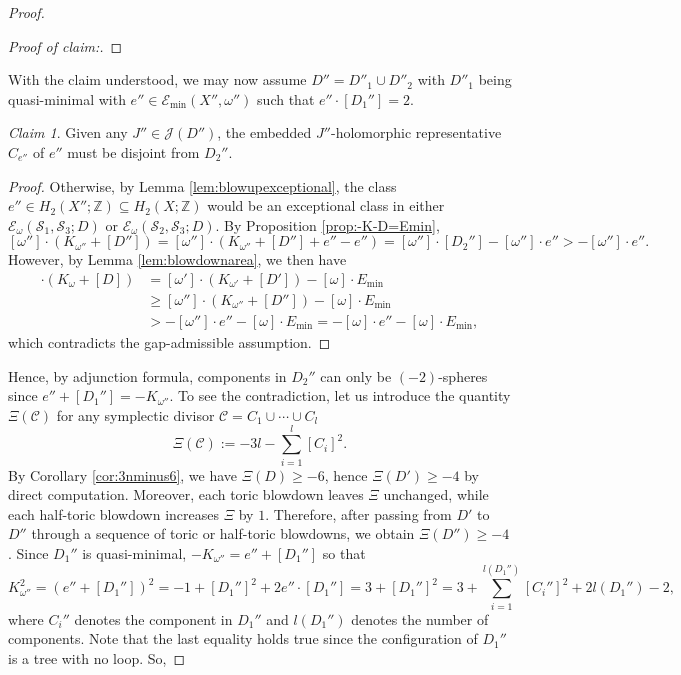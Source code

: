\documentclass[11pt]{article}
\theoremstyle{definition}
\theoremstyle{remark}
\newtheorem{claim}[theorem]{Claim}
\newcommand{\st}{\mathcal{S}}
\begin{document}
\begin{proof}
\begin{proof}[Proof of claim:]
\end{proof}
 With the claim understood, we may now assume $D''=D''_1\cup D''_2$ with $D''_1$ being quasi-minimal with $e''\in\mathcal{E}_{\text{min}}(X'',\omega'')$ such that $e''\cdot [D_1'']=2$.
 \begin{claim}
Given any $J''\in\mathcal{J}(D'')$, the embedded $J''$-holomorphic representative $C_{e''}$ of $e''$ must be disjoint from $D_2''$.
 \end{claim}
\begin{proof}
  Otherwise, by Lemma \ref{lem:blowupexceptional}, the class $e''\in H_2(X'';\mathbb{Z})\subseteq H_2(X;\mathbb{Z})$ would be an exceptional class in either $\mathcal{E}_\omega(\st_1,\st_3;D)$ or $\mathcal{E}_\omega(\st_2,\st_3;D)$. By Proposition \ref{prop:-K-D=Emin},\[[\omega'']\cdot(K_{\omega''}+[D''])=[\omega'']\cdot(K_{\omega''}+[D'']+e''- e'')=[\omega'']\cdot[D_2'']-[\omega'']\cdot e''>-[\omega'']\cdot e''.\]
  However, by Lemma \ref{lem:blowdownarea}, we then have
  \begin{align*}
  [\omega]\cdot(K_{\omega}+[D])&=[\omega']\cdot(K_{\omega'}+[D'])-[\omega]\cdot E_{\text{min}}\\
  &\geq [\omega'']\cdot(K_{\omega''}+[D''])-[\omega]\cdot E_{\text{min}}\\
  &>-[\omega'']\cdot e''-[\omega]\cdot E_{\text{min}}=-[\omega]\cdot e''-[\omega]\cdot E_{\text{min}},
  \end{align*}
  which contradicts the gap-admissible assumption.
\end{proof}
Hence, by adjunction formula, components in $D_2''$ can only be $(-2)$-spheres since $e''+[D_1'']=-K_{\omega''}$. To see the contradiction, let us introduce the quantity $\Xi(\mathcal{C})$ for any symplectic divisor $\mathcal{C}=C_1\cup\cdots \cup C_l$
\[\Xi(\mathcal{C}):=-3l-\sum_{i=1}^l[C_i]^2.\]
By Corollary \ref{cor:3nminus6}, we have $\Xi(D)\geq -6$, hence $\Xi(D')\geq -4$ by direct computation. Moreover, each toric blowdown leaves $\Xi$ unchanged, while each half-toric blowdown increases $\Xi$ by $1$. Therefore, after passing from $D'$ to $D''$ through a sequence of toric or half-toric blowdowns, we obtain $\Xi(D'')\geq -4$. Since $D_1''$ is quasi-minimal, $-K_{\omega''}=e''+[D_1'']$ so that 
\[K_{\omega''}^2=(e''+[D_1''])^2=-1+[D_1'']^2+2e''\cdot[D_1'']=3+[D_1'']^2=3+\sum_{i=1}^{l(D_1'')} [C_i'']^2+2l(D_1'')-2,\]
where $C_i''$ denotes the component in $D_1''$ and $l(D_1'')$ denotes the number of components. Note that the last equality holds true since the configuration of $D_1''$ is a tree with no loop. So,

\end{proof}
\end{document}

